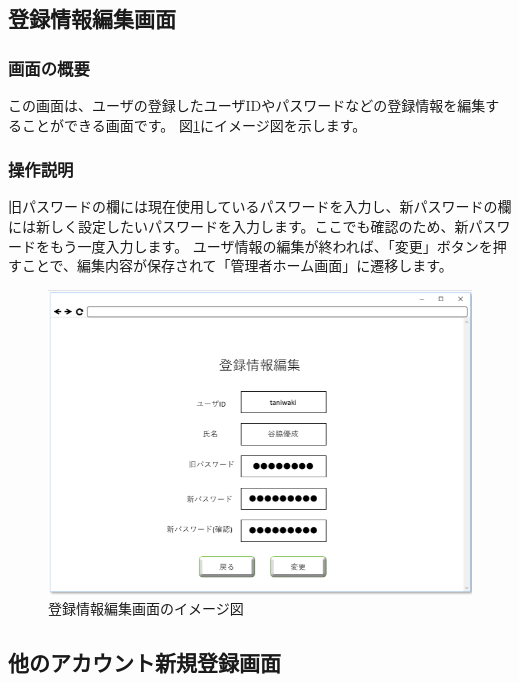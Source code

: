 \subsection{登録情報編集画面}
\subsubsection{画面の概要}
この画面は、ユーザの登録したユーザIDやパスワードなどの登録情報を編集することができる画面です。
図\ref{fig:06}にイメージ図を示します。

\subsubsection{操作説明}
旧パスワードの欄には現在使用しているパスワードを入力し、新パスワードの欄には新しく設定したいパスワードを入力します。ここでも確認のため、新パスワードをもう一度入力します。
ユーザ情報の編集が終われば、「変更」ボタンを押すことで、編集内容が保存されて「管理者ホーム画面」に遷移します。

\begin{figure}[htbp]
  \begin{center}
    \includegraphics[width=1\linewidth,clip]{./img/06.png}
    \caption{登録情報編集画面のイメージ図}\label{fig:06}
  \end{center}
\end{figure}

\newpage

\subsection{他のアカウント新規登録画面}
